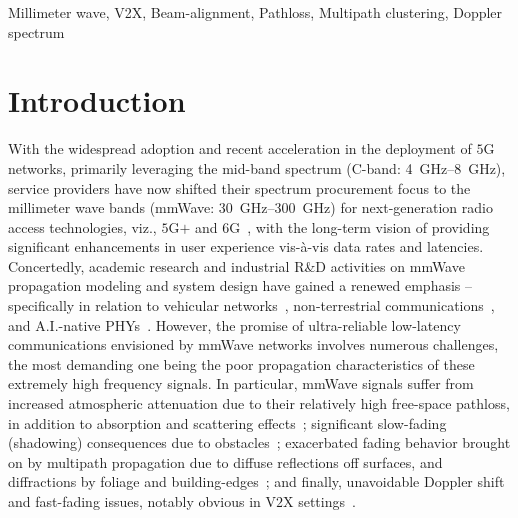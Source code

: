 \documentclass[12pt, draftcls, onecolumn]{IEEEtran}
\begin{document}
\begin{IEEEkeywords}
    Millimeter wave, V2X, Beam-alignment, Pathloss, Multipath clustering, Doppler spectrum
\end{IEEEkeywords}
\vspace{-4mm}

\section{Introduction}\label{S1}
With the widespread adoption and recent acceleration in the deployment of $5$G networks, primarily leveraging the mid-band spectrum (C-band: \SIrange{4}{8}{\giga\hertz}), service providers have now shifted their spectrum procurement focus to the millimeter wave bands (mmWave: \SIrange{30}{300}{\giga\hertz}) for next-generation radio access technologies, viz., $5$G$+$ and $6$G~\cite{mmWaveSurvey, Commercial, 5GBSurvey, 6GSurvey}, with the long-term vision of providing significant enhancements in user experience vis-\`{a}-vis data rates and latencies. Concertedly, academic research and industrial R\&D activities on mmWave propagation modeling and system design have gained a renewed emphasis -- specifically in relation to vehicular networks~\cite{VehicularBeamSelection, CVBeamAlignmentV2X}, non-terrestrial communications~\cite{mmWaveRuralNTNOpportunities, UAVBeamTracking}, and A.I.-native PHYs~\cite{6GAINative, OTAGANs}. However, the promise of ultra-reliable low-latency communications envisioned by mmWave networks involves numerous challenges, the most demanding one being the poor propagation characteristics of these extremely high frequency signals. In particular, mmWave signals suffer from increased atmospheric attenuation due to their relatively high free-space pathloss, in addition to absorption and scattering effects~\cite{Rappaport}; significant slow-fading (shadowing) consequences due to obstacles~\cite{SuburbanGeometryJournal}; exacerbated fading behavior brought on by multipath propagation due to diffuse reflections off surfaces, and diffractions by foliage and building-edges~\cite{Outdoor28G}; and finally, unavoidable Doppler shift and fast-fading issues, notably obvious in V$2$X settings~\cite{V2XBlockages}.
\end{document}
